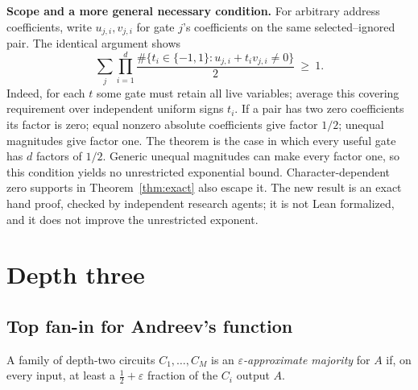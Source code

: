 \documentclass[11pt,letterpaper]{article}
\theoremstyle{remark}
\newcommand{\sect}[1]{\section{\texorpdfstring{\color{ink}#1}{#1}}}
\newcommand{\subsect}[1]{\subsection*{\texorpdfstring{\color{ink}#1}{#1}}}
\newcommand{\smalltitle}[1]{\textbf{\color{ink}#1}\quad}
\begin{document}
\smalltitle{Scope and a more general necessary condition.}
For arbitrary address coefficients, write $u_{j,i},v_{j,i}$ for gate $j$'s
coefficients on the same selected--ignored pair. The identical argument
shows
$$
\sum_j\prod_{i=1}^d
 \frac{\#\{t_i\in\{-1,1\}:u_{j,i}+t_iv_{j,i}\ne0\}}{2}\ \ge\ 1.
$$
Indeed, for each $t$ some gate must retain all live variables; average
this covering requirement over independent uniform signs $t_i$.
If a pair has two zero coefficients its factor is zero; equal nonzero
absolute coefficients give factor $1/2$; unequal magnitudes give factor
one. The theorem is the case in which every useful gate has $d$ factors
of $1/2$. Generic unequal magnitudes can make every factor one, so this
condition yields no unrestricted exponential bound. Character-dependent
zero supports in Theorem~\ref{thm:exact} also escape it. The new result is
an exact hand proof, checked by independent research agents; it is not
Lean formalized, and it does not improve the unrestricted exponent.

\sect{Depth three}\label{sec:depth3}

\subsect{Top fan-in for Andreev's function}

A family of depth-two circuits $C_1,\dots,C_M$ is an
\emph{$\varepsilon$-approximate majority} for $A$ if, on every input, at
least a $\tfrac12+\varepsilon$ fraction of the $C_i$ output $A$.
\end{document}
